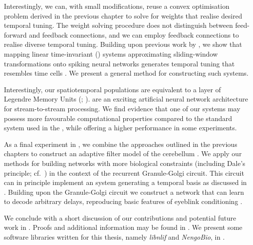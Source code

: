 Interestingly, we can, with small modifications, reuse a convex optimisation problem derived in the previous chapter to solve for weights that realise desired temporal tuning.
The weight solving procedure does not distinguish between feed-forward and feedback connections, and we can employ feedback connections to realise diverse temporal tuning.
Building upon previous work by \citet{voelker2018improving}, we show that mapping linear time-invariant (\LTI) systems approximating sliding-window transformations onto spiking neural networks generates temporal tuning that resembles time cells \citep{pastalkova2008internally,howard2014unified,tiganj2016sequential}.
We present a general method for constructing such \LTI systems.

Interestingly, our spatiotemporal \NEF populations are equivalent to a layer of Legendre Memory Units (\LMUpl; \cite{voelker2019lmu}).
\LMUpl are an exciting artificial neural network architecture for stream-to-stream processing.
We find evidence that one of our \LTI systems may possess more favourable computational properties compared to the standard \LTI system used in the \LMU, while offering a higher performance in some experiments.

As a final experiment in , we combine the approaches outlined in the previous chapters to construct an adaptive filter model of the cerebellum \citep{fujita1982adaptive}.
We apply our methods for building \NEF networks with more biological constraints (including Dale's principle; cf.~) in the context of the recurrent Granule-Golgi circuit.
This circuit can in principle implement an \LTI system generating a temporal basis as discussed in .
Building upon the Granule-Golgi circuit we construct a network that can learn to decode arbitrary delays, reproducing basic features of eyeblink conditioning \citep[e.g.,][]{heiney2014cerebellardependent}.

We conclude with a short discussion of our contributions and potential future work in .
Proofs and additional information may be found in .
We present some software libraries written for this thesis, namely \emph{libnlif} and \emph{NengoBio}, in .

